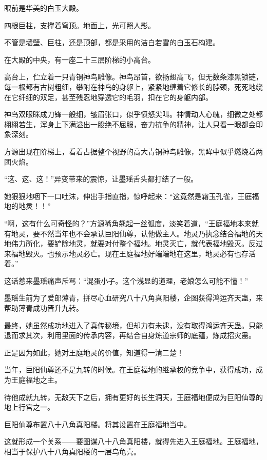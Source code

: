 
\begin{this_body}

眼前是华美的白玉大殿。

四根巨柱，支撑着穹顶。地面上，光可照人影。

不管是墙壁、巨柱，还是顶部，都是采用的洁白若雪的白玉石构建。

在大殿的中央，有一座二十三层阶梯的小高台。

高台上，伫立着一只青铜神鸟雕像。神鸟昂首，欲扬翅高飞，但无数条漆黑锁链，每一根都有古树粗细，攀附在神鸟的身躯上，紧紧地缠着它修长的脖颈，死死地绕在它纤细的双足，甚至残忍地穿透它的毛羽，扣在它的身躯内部。

神鸟双眼眯成刀锋一般细，皱眉张口，似乎愤怒尖叫。神情动人心魄，细微之处都栩栩若生，浑身上下满溢出一股绝不屈服，奋力抗争的精神，让人只看一眼都会印象深刻。

方源出现在阶梯上，看着占据整个视野的高大青铜神鸟雕像，黑眸中似乎燃烧着两团火焰。

“这、这、这！”异变带来的震惊，让墨瑶舌头都打结了一般。

她狠狠地咽下一口吐沫，伸出手指直指，惊呼起来：“这竟然是霜玉孔雀，王庭福地的地灵！！”

“啊，这有什么可奇怪的？”方源嘴角翘起一丝弧度，淡笑着道，“王庭福地本来就有地灵，要不然当年也不会承认巨阳仙尊，认他做主人。地灵乃执念结合福地的天地伟力所化，要铲除地灵，就要对付整个福地。地灵灭亡，就代表福地毁灭。反过来福地毁灭。也预示地灵必亡。现在王庭福地好端端地在这里，地灵必有也存活着。”

这话惹来墨瑶痛声斥骂：“混蛋小子。这个浅显的道理，老娘怎么可能不懂！”

墨瑶生前为了爱郎薄青，拼尽心血研究八十八角真阳楼，企图获得鸿运齐天蛊，来帮助薄青成功晋升九转。

最终，她虽然成功地进入了真传秘境，但却力有未逮，没有取得鸿运齐天蛊。只能退而求其次，利用里面的传承内容，再结合自身炼道宗师的底蕴，炼成招灾蛊。

正是因为如此，她对王庭地灵的价值，知道得一清二楚！

当年，巨阳仙尊还不是九转的时候。在王庭福地的继承权的竞争中，获得成功，成为王庭福地之主。

待他成就九转，无敌天下之后，拥有更好的长生洞天，王庭福地便成为巨阳仙尊的地上行宫之一。

巨阳仙尊布置八十八角真阳楼。将其设置在王庭福地当中。

这就形成一个关系——要图谋八十八角真阳楼，就得先进入王庭福地。王庭福地，相当于保护八十八角真阳楼的一层乌龟壳。


\end{this_body}
